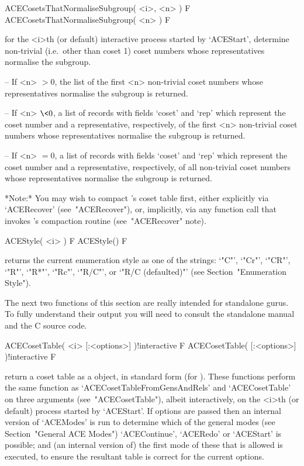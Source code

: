 \>ACECosetsThatNormaliseSubgroup( <i>, <n> ) F
\>ACECosetsThatNormaliseSubgroup( <n> ) F

for the <i>th (or  default)  interactive  {\ACE}  process  started  by
`ACEStart', determine non-trivial  (i.e.~other  than  coset  1)  coset
numbers whose representatives normalise the subgroup.

\beginlist%

\item{--} If <n> $> 0$, the list of the first  <n>  non-trivial  coset
numbers whose representatives normalise the subgroup is returned.

\item{--} If <n> $\< 0$, a list of records  with  fields  `coset'  and
`rep'  which  represent  the  coset  number  and   a   representative,
respectively,  of  the  first  <n>  non-trivial  coset  numbers  whose
representatives normalise the subgroup is returned.

\item{--} If <n> $= 0$, a list of  records  with  fields  `coset'  and
`rep'  which  represent  the  coset  number  and   a   representative,
respectively, of all non-trivial coset numbers  whose  representatives
normalise the subgroup is returned.

\endlist

*Note:*
You may wish to compact {\ACE}'s coset table first, either  explicitly
via `ACERecover' (see~"ACERecover"), or, implicitly, via any  function
call that invokes {\ACE}'s compaction routine (see~"ACERecover" note).

\>ACEStyle( <i> ) F
\>ACEStyle() F

returns the current enumeration style as one of  the  strings:  `"C"',
`"Cr"', `"CR"', `"R"', `"R*"', `"Rc"', `"R/C"', or `"R/C (defaulted)"'
(see Section~"Enumeration Style").

The next two functions of this section are really intended for  {\ACE}
standalone gurus. To fully understand their output you  will  need  to
consult the standalone manual and the C source code.


\>ACECosetTable( <i> [:<options>] )!{interactive} F
\>ACECosetTable( [:<options>] )!{interactive} F

return a coset table  as  a  {\GAP}  object,  in  standard  form  (for
{\GAP}).   These   functions   perform   the    same    function    as
`ACECosetTableFromGensAndRels' and `ACECosetTable' on three  arguments
(see~"ACECosetTable"), albeit interactively, on the <i>th (or default)
process started by `ACEStart'. If options are passed then an  internal
version of `ACEModes' is run to determine which of the general  {\ACE}
modes (see Section~"General ACE Modes")  `ACEContinue',  `ACERedo'  or
`ACEStart' is possible; and (an internal version of) the first mode of
these that is allowed is executed, to ensure the  resultant  table  is
correct for the current options.


